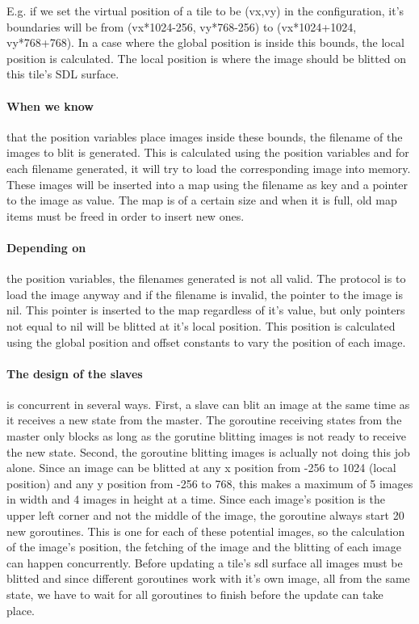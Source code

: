 \documentclass[12pt, a4paper, oneside]{article}
\begin{document}
E.g. if we set the virtual position of a tile to be (vx,vy) in the configuration, it's boundaries will be from (vx*1024-256, vy*768-256) to (vx*1024+1024, vy*768+768). In a case where the global position is inside this bounds, the local position is calculated. The local position is where the image should be blitted on this tile's SDL surface.

\paragraph{When we know}
that the position variables place images inside these bounds, the filename of the images to blit is generated. This is calculated using the position variables and for each filename generated, it will try to load the corresponding image into memory. These images will be inserted into a map using the filename as key and a pointer to the image as value. The map is of a certain size and when it is full, old map items must be freed in order to insert new ones.

\paragraph{Depending on}
the position variables, the filenames generated is not all valid. The protocol is to load the image anyway and if the filename is invalid, the pointer to the image is nil. This pointer is inserted to the map regardless of it's value, but only pointers not equal to nil will be blitted at it's local position. This position is calculated using the global position and offset constants to vary the position of each image.    

\paragraph{The design of the slaves} 
is concurrent in several ways. First, a slave can blit an image at the same time as it receives a new state from the master. The goroutine receiving states from the master only blocks as long as the gorutine blitting images is not ready to receive the new state.
Second, the goroutine blitting images is aclually not doing this job alone. Since an image can be blitted at any x position from -256 to 1024 (local position) and any y position from -256 to 768, this makes a maximum of 5 images in width and 4 images in height at a time. Since each image's position is the upper left corner and not the middle of the image, the goroutine always start 20 new goroutines. This is one for each of these potential images, so the calculation of the image's position, the fetching of the image and the blitting of each image can happen concurrently. Before updating a tile's sdl surface all images must be blitted and since different goroutines work with it's own image, all from the same state, we have to wait for all goroutines to finish before the update can take place.
\end{document}
